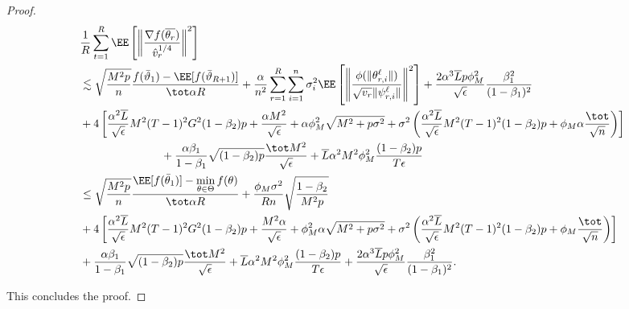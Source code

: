 \documentclass[nohyperref]{article}
\theoremstyle{plain}
\theoremstyle{definition}
\theoremstyle{remark}
\begin{document}
\begin{proof}
\begin{align*}
    &\frac{1}{R}\sum_{t=1}^R  \EE\left[ \left\| \frac{\nabla f(\overline{\theta_r})}{\hat v_r^{1/4}}   \right \|^2 \right] \\
    & \lesssim  \sqrt{\frac{M^2 p}{n}} \frac{ f(\bar{\vartheta}_1)  - \EE[ f(\bar{\vartheta}_{R+1})]}{\tot \alpha R}+   \frac{\alpha}{n^2}  \sum_{r=1}^R  \sum_{i = 1}^n  \sigma_i^2 \EE\left[ \left\|\frac{\phi(\|\theta_{r,i}^{\ell}\|)}{\sqrt{v_r} \|\psi_{r,i}^{\ell}\|} \right\|^2 \right] +\frac{2\alpha^3 \overline{L} p\phi_M^2}{ \sqrt{\epsilon}}\frac{\beta_1^2}{(1-\beta_1)^2} \nonumber\\
   &   +4 \left[ \frac{\alpha^2 \overline{L}}{\sqrt{\epsilon}}  M^2 (T-1)^2 G^2 (1-\beta_2)p + \frac{\alpha M^2}{\sqrt{\epsilon}}+ \alpha \phi_M^2 \sqrt{M^2+p\sigma^2} + \sigma^2 \left(\frac{\alpha^2 \overline{L}}{\sqrt{\epsilon}}  M^2 (T-1)^2(1-\beta_2)p+ \phi_M\alpha \frac{\tot }{\sqrt{n}} \right)\right] \nonumber \\
   & \hspace{1in} +\frac{\alpha \beta_1}{1-\beta_1}  \sqrt{(1-\beta_2)p} \frac{\tot M^2}{\sqrt{\epsilon}} +\overline{L} \alpha^2 M^2 \phi_M^2 \frac{(1-\beta_2)p}{T\epsilon} \nonumber\\
   & \leq   \sqrt{\frac{M^2 p}{n}}  \frac{ \EE[f(\bar{\theta}_1)]  - \min \limits_{\theta \in \Theta} f(\theta)}{\tot \alpha R} +      \frac{\phi_M   \sigma^2}{R n} \sqrt{\frac{1 - \beta_2}{M^2 p}  } \\
   &+4 \left[ \frac{\alpha^2 \overline{L}}{\sqrt{\epsilon}}  M^2 (T-1)^2 G^2 (1-\beta_2)p + \frac{M^2 \alpha }{\sqrt{\epsilon}}+\phi_M^2 \alpha \sqrt{M^2+p\sigma^2} + \sigma^2 \left(\frac{\alpha^2 \overline{L}}{\sqrt{\epsilon}}  M^2 (T-1)^2(1-\beta_2)p+ \phi_M \frac{\tot }{\sqrt{n}} \right)\right] \\
   &+\frac{\alpha \beta_1}{1-\beta_1}  \sqrt{(1-\beta_2)p} \frac{\tot M^2}{\sqrt{\epsilon}} +\overline{L} \alpha^2 M^2 \phi_M^2 \frac{(1-\beta_2)p}{T\epsilon} +\frac{2\alpha^3 \overline{L} p\phi_M^2}{ \sqrt{\epsilon}}\frac{\beta_1^2}{(1-\beta_1)^2}.
\end{align*}

This concludes the proof.

\end{proof}
\end{document}
